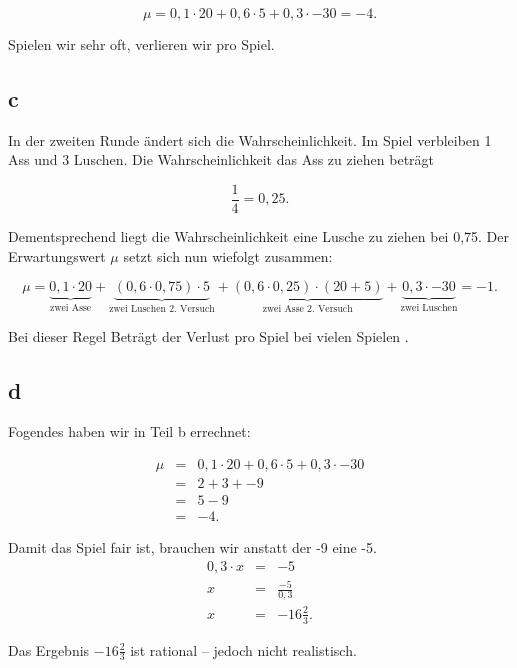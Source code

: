 \documentclass[12pt]{article}
\begin{document}
\begin{equation*}
\mu = 0,1 \cdot 20 + 0,6 \cdot 5 + 0,3 \cdot -30 = -4.
\end{equation*}

Spielen wir sehr oft, verlieren wir  pro Spiel.
\subsection*{c}
In der zweiten Runde ändert sich die Wahrscheinlichkeit. Im Spiel verbleiben 1 Ass und 3 Luschen.
Die Wahrscheinlichkeit das Ass zu ziehen beträgt

\begin{equation*}
\frac{1}{4} = 0,25.
\end{equation*}

Dementsprechend liegt die Wahrscheinlichkeit eine Lusche zu ziehen bei 0,75. Der Erwartungswert $\mu$ setzt sich nun wiefolgt zusammen:

\begin{equation*}
\mu = \underbrace{ 0,1 \cdot 20}_{\text{zwei Asse}} + \underbrace{(0,6 \cdot 0,75) \cdot 5}_{\text{zwei Luschen 2. Versuch}} +  \underbrace{(0,6 \cdot 0,25) \cdot (20+5)}_{\text{zwei Asse 2. Versuch}}   + \underbrace{0,3 \cdot -30}_{\text{zwei Luschen}}  = -1.
\end{equation*}

Bei dieser Regel Beträgt der Verlust pro Spiel bei vielen Spielen .




\subsection*{d}
Fogendes haben wir in Teil b errechnet:

\begin{eqnarray*}
\mu &=& 0,1 \cdot 20 + 0,6 \cdot 5 + 0,3 \cdot -30  \\
    &=& 2 + 3 + -9  \\
    &=& 5 - 9 \\
    &=& -4.
\end{eqnarray*}


Damit das Spiel fair ist, brauchen wir anstatt der -9 eine -5. 
\begin{eqnarray*}
0,3 \cdot x &=& -5 \\
x           &=& \frac{-5}{0,3} \\
x           &=& -16 \frac{2}{3}.
\end{eqnarray*}

Das Ergebnis $-16 \frac{2}{3}$ ist rational -- jedoch nicht realistisch.
\end{document}
